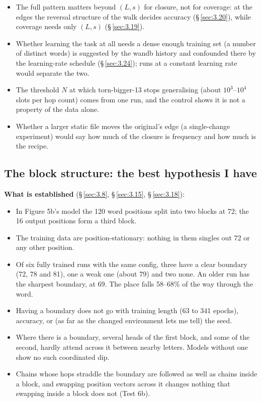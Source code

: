 \documentclass[paper=a4,fontsize=11pt,DIV=11,parskip=half,headings=small,numbers=noendperiod]{scrartcl}
\DeclareRobustCommand{\lead}[1]{\textsf{\bfseries\color{accent}#1}}
\DeclareRobustCommand{\code}[1]{{\fontseries{m}\ttfamily #1}}
\begin{document}
\begin{itemize}
\item The full pattern matters beyond $(L,s)$ for closure, not for coverage: at the edges the reversal structure
  of the walk decides accuracy (\S\,\ref{sec:3.20}), while coverage needs only $(L,s)$ (\S\,\ref{sec:3.19}).
\item Whether learning the task at all needs a dense enough training set (a number of distinct words) is
  suggested by the wandb history and confounded there by the learning-rate schedule (\S\,\ref{sec:3.24}); runs
  at a constant learning rate would separate the two.
\item The threshold $N$ at which \code{torn-\allowbreak{}bigger-\allowbreak{}13} stops generalising (about
  $10^3$–$10^4$ slots per hop count) comes from one run, and the control shows it is not a property of the data
  alone.
\item Whether a larger static file moves the original’s edge (a single-change experiment) would say how much of
  the closure is frequency and how much is the recipe.
\end{itemize}

\subsection{The block structure: the best hypothesis I have}\label{sec:4.3}
\lead{What is established} (\S\,\ref{sec:3.8}, \S\,\ref{sec:3.15}, \S\,\ref{sec:3.18}):

\begin{itemize}
\item In Figure 5b’s model the 120 word positions split into two blocks at 72; the 16 output positions form a
  third block.
\item The training data are position-stationary: nothing in them singles out 72 or any other position.
\item Of six fully trained runs with the same config, three have a clear boundary (72, 78 and 81), one a weak
  one (about 79) and two none. An older run has the sharpest boundary, at 69. The place falls 58–68\% of the way
  through the word.
\item Having a boundary does not go with training length (63 to 341 epochs), accuracy, or (as far as the changed
  environment lets me tell) the seed.
\item Where there is a boundary, several heads of the first block, and some of the second, hardly attend across
  it between nearby letters. Models without one show no such coordinated dip.
\item Chains whose hops straddle the boundary are followed as well as chains inside a block, and swapping
  position vectors across it changes nothing that swapping inside a block does not (Test 6b).
\end{itemize}
\end{document}
